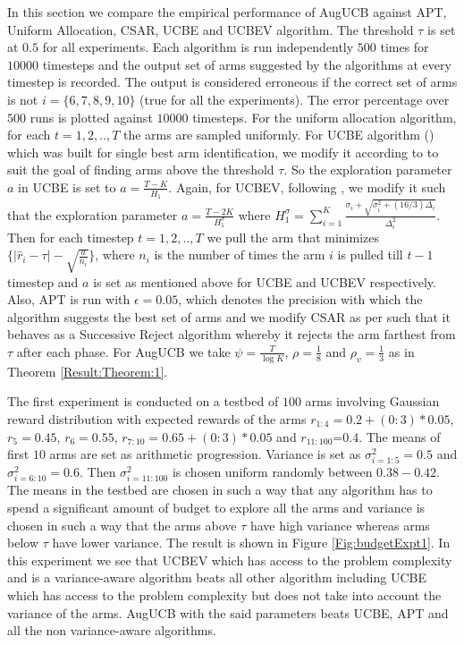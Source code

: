	In this section we compare the empirical performance of AugUCB against APT, Uniform Allocation, CSAR, UCBE and UCBEV algorithm. The threshold $\tau$ is set at $0.5$ for all experiments. Each algorithm is run independently $500$ times for $10000$ timesteps and the output set of arms suggested by the algorithms at every timestep is recorded. The output is considered erroneous if the correct set of arms is not $i=\lbrace 6,7,8,9,10 \rbrace$ (true for all the experiments). The error percentage over $500$ runs is plotted against $10000$ timesteps. For the uniform allocation algorithm, for each $t=1,2,..,T$ the arms are sampled uniformly. For UCBE algorithm (\cite{audibert2009exploration}) which was built for single best arm identification, we modify it according to \cite{locatelli2016optimal} to suit the goal of finding arms above the threshold $\tau$. So the exploration parameter $a$ in UCBE is set to $a=\frac{T-K}{H_1}$. Again, for UCBEV, following \cite{gabillon2011multi}, we modify it such that the exploration parameter $a = \frac{T-2K}{H_{1}^{\sigma}}$ where $H_{1}^{\sigma}=\sum_{i=1}^{K}\frac{\sigma_{i}+\sqrt{\sigma_{i}^{2}+(16/3)\Delta_{i}}}{\Delta_{i}^{2}}$. Then for each timestep $t=1,2,..,T$ we pull the arm that minimizes $\lbrace |\hat{r}_{i} -\tau|-\sqrt{\frac{a}{n_{i}}} \rbrace$, where $n_{i}$ is the number of times the arm $i$ is pulled till $t-1$ timestep and $a$ is set as mentioned above for UCBE and UCBEV respectively. Also, APT is run with $\epsilon=0.05$, which denotes the precision with which the algorithm suggests the best set of arms and we modify CSAR as per \cite{locatelli2016optimal} such that it behaves as a Successive Reject algorithm whereby it rejects the arm farthest from $\tau$ after each phase. For AugUCB we take $\psi=\frac{T}{\log K}$, $\rho=\frac{1}{8}$ and $\rho_v=\frac{1}{3}$ as in Theorem \ref{Result:Theorem:1}.
	
	The first experiment is conducted on a testbed of $100$ arms involving Gaussian reward distribution with expected rewards of the arms $r_{1:4}=0.2+(0:3)*0.05$, $r_{5}=0.45$, $r_{6}=0.55$, $r_{7:10}=0.65+(0:3)*0.05$ and $r_{11:100}$=0.4. The means of first $10$ arms are set as arithmetic progression. Variance is set as $\sigma_{i=1:5}^{2}=0.5$ and $\sigma_{i=6:10}^{2}=0.6$. Then $\sigma_{i=11:100}^{2}$ is chosen uniform randomly between $0.38-0.42$. The means in the testbed are chosen in such a way that any algorithm has to spend a significant amount of budget to explore all the arms and variance is chosen in such a way that the arms above $\tau$ have high variance whereas arms below $\tau$ have lower variance. The result is shown in Figure \ref{Fig:budgetExpt1}. In this experiment we see that UCBEV which has access to the problem complexity and is a variance-aware algorithm beats all other algorithm including UCBE which has access to the problem complexity but does not take into account the variance of the arms. AugUCB with the said parameters beats UCBE, APT and all the non variance-aware algorithms. 
	
